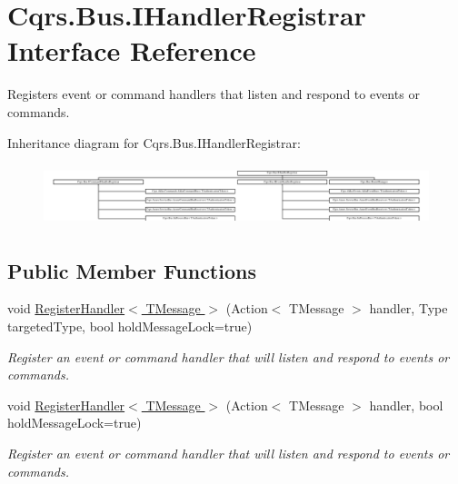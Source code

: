 \hypertarget{interfaceCqrs_1_1Bus_1_1IHandlerRegistrar}{}\section{Cqrs.\+Bus.\+I\+Handler\+Registrar Interface Reference}
\label{interfaceCqrs_1_1Bus_1_1IHandlerRegistrar}


Registers event or command handlers that listen and respond to events or commands.  


Inheritance diagram for Cqrs.\+Bus.\+I\+Handler\+Registrar\+:\begin{figure}[H]
\begin{center}
\leavevmode
\includegraphics[height=1.814255cm]{interfaceCqrs_1_1Bus_1_1IHandlerRegistrar}
\end{center}
\end{figure}
\subsection*{Public Member Functions}
\begin{DoxyCompactItemize}
\item 
void \hyperlink{interfaceCqrs_1_1Bus_1_1IHandlerRegistrar_ab6ca4dfdc54a5aeebe4651dbdb479f55_ab6ca4dfdc54a5aeebe4651dbdb479f55}{Register\+Handler$<$ T\+Message $>$} (Action$<$ T\+Message $>$ handler, Type targeted\+Type, bool hold\+Message\+Lock=true)
\begin{DoxyCompactList}\small\item\em Register an event or command handler that will listen and respond to events or commands. \end{DoxyCompactList}\item 
void \hyperlink{interfaceCqrs_1_1Bus_1_1IHandlerRegistrar_a07792dcc9a8b272709ff2e2dd336a642_a07792dcc9a8b272709ff2e2dd336a642}{Register\+Handler$<$ T\+Message $>$} (Action$<$ T\+Message $>$ handler, bool hold\+Message\+Lock=true)
\begin{DoxyCompactList}\small\item\em Register an event or command handler that will listen and respond to events or commands. \end{DoxyCompactList}\end{DoxyCompactItemize}


